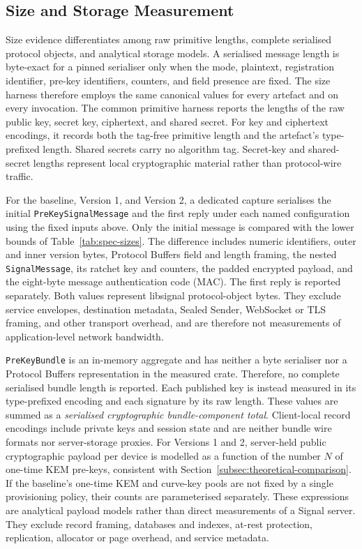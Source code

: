 \subsection{Size and Storage Measurement}
\label{subsec:size-measurement}

Size evidence differentiates among raw primitive lengths, complete serialised protocol objects, and analytical storage models. A serialised message length is byte-exact for a pinned serialiser only when the mode, plaintext, registration identifier, pre-key identifiers, counters, and field presence are fixed. The size harness therefore employs the same canonical values for every artefact and on every invocation. The common primitive harness reports the lengths of the raw public key, secret key, ciphertext, and shared secret. For key and ciphertext encodings, it records both the tag-free primitive length and the artefact's type-prefixed length. Shared secrets carry no algorithm tag. Secret-key and shared-secret lengths represent local cryptographic material rather than protocol-wire traffic.

For the baseline, Version 1, and Version 2, a dedicated capture serialises the initial \texttt{PreKeySignalMessage} and the first reply under each named configuration using the fixed inputs above. Only the initial message is compared with the lower bounds of Table~\ref{tab:spec-sizes}. The difference includes numeric identifiers, outer and inner version bytes, Protocol Buffers field and length framing, the nested \texttt{SignalMessage}, its ratchet key and counters, the padded encrypted payload, and the eight-byte message authentication code (MAC). The first reply is reported separately. Both values represent libsignal protocol-object bytes. They exclude service envelopes, destination metadata, Sealed Sender, WebSocket or TLS framing, and other transport overhead, and are therefore not measurements of application-level network bandwidth.

\texttt{PreKeyBundle} is an in-memory aggregate and has neither a byte serialiser nor a Protocol Buffers representation in the measured crate. Therefore, no complete serialised bundle length is reported. Each published key is instead measured in its type-prefixed encoding and each signature by its raw length. These values are summed as a \emph{serialised cryptographic bundle-component total}. Client-local record encodings include private keys and session state and are neither bundle wire formats nor server-storage proxies. For Versions 1 and 2, server-held public cryptographic payload per device is modelled as a function of the number \(N\) of one-time KEM pre-keys, consistent with Section~\ref{subsec:theoretical-comparison}. If the baseline's one-time KEM and curve-key pools are not fixed by a single provisioning policy, their counts are parameterised separately. These expressions are analytical payload models rather than direct measurements of a Signal server. They exclude record framing, databases and indexes, at-rest protection, replication, allocator or page overhead, and service metadata.

